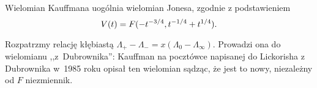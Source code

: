 \begin{proposition}
%
    Wielomian Kauffmana uogólnia wielomian Jonesa, zgodnie z podstawieniem
    \begin{equation}
        V(t)=F(-t^{-3/4},t^{-1/4}+t^{1/4}).
    \end{equation}
\end{proposition}

Rozpatrzmy relację kłębiastą $\Lambda_+ - \Lambda_- = x(\Lambda_0 - \Lambda_\infty)$.
Prowadzi ona do wielomianu ,,z~Dubrownika'': Kauffman na pocztówce napisanej do Lickorisha z Dubrownika w~1985 roku opisał ten wielomian sądząc, że jest to nowy, niezależny od $F$ niezmiennik.
%
%
%


